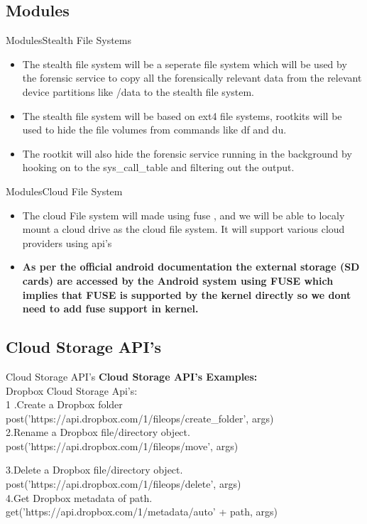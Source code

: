 \documentclass{beamer}
\begin{document}
\subsection{Modules}
\begin{frame}{Modules}{Stealth File Systems}
\begin{itemize}
\item The stealth file system will be a seperate file system which will be used by the forensic service to
copy all the forensically relevant data from the relevant device partitions like /data to the stealth
file system.
\item  The stealth file system will be based on ext4 file systems, rootkits will be used to hide
the file volumes from commands like df and du. \item The rootkit will also hide the forensic service
running in the background by hooking on to the sys\_call\_table and filtering out the output. 

\end{itemize}
\end{frame}
\begin{frame}{Modules}{Cloud File System}
\begin{itemize}
\item The cloud File system will made using fuse , and we will be able to localy mount a cloud drive
as the cloud file system. It will support various cloud providers using api’s
\item \textbf{As per the official android documentation the external storage (SD cards) are accessed by the
Android system using FUSE which implies that FUSE is supported by the kernel directly so we
dont need to add fuse support in kernel.}
\end{itemize}
\end{frame}
\subsection{Cloud Storage API's}
\begin{frame}{Cloud Storage API's}
\textbf{Cloud Storage API's Examples:}\\
Dropbox Cloud Storage Api's:\\
1 .Create a Dropbox folder 
\bigskip
post('https://api.dropbox.com/1/fileops/create\_folder', args)\\

2.Rename a Dropbox file/directory object.
\bigskip
post('https://api.dropbox.com/1/fileops/move', args)

3.Delete a Dropbox file/directory object.
\bigskip
post('https://api.dropbox.com/1/fileops/delete', args)\\
4.Get Dropbox metadata of path.
\bigskip
get('https://api.dropbox.com/1/metadata/auto' + path, args)


\end{frame}
\end{document}
